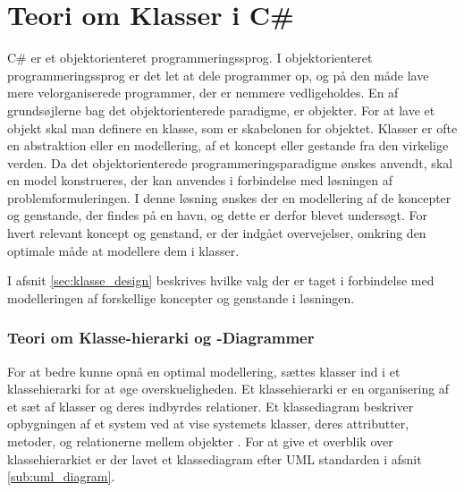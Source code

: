 \section{Teori om Klasser i C\#}
\label{sec:klasse_teori}

C\# er et objektorienteret programmeringssprog. I objektorienteret programmeringssprog er det let at dele programmer op, og på den måde lave mere velorganiserede programmer, der er nemmere vedligeholdes. En af grundsøjlerne bag det objektorienterede paradigme, er objekter. For at lave et objekt skal man definere en klasse, som er skabelonen for objektet. Klasser er ofte en abstraktion eller en modellering, af et koncept eller gestande fra den virkelige verden. Da det objektorienterede programmeringsparadigme ønskes anvendt, skal en model konstrueres, der kan anvendes i forbindelse med løsningen af problemformuleringen. I denne løsning ønskes der en modellering af de koncepter og genstande, der findes på en havn, og dette er derfor blevet undersøgt. For hvert relevant koncept og genstand, er der indgået overvejelser, omkring den optimale måde at modellere dem i klasser.

I afsnit \cref{sec:klasse_design} beskrives hvilke valg der er taget i forbindelse med modelleringen af forskellige koncepter og genstande i løsningen.

\subsubsection{Teori om Klasse-hierarki og -Diagrammer}
\label{sub:uml_teori}

For at bedre kunne opnå en optimal modellering, sættes klasser ind i et klassehierarki for at øge overskueligheden. Et klassehierarki er en organisering af et sæt af klasser og deres indbyrdes relationer. Et klassediagram beskriver opbygningen af et system ved at vise systemets klasser, deres attributter, metoder, og relationerne mellem objekter \cite{martin2006agile}. For at give et overblik over klassehierarkiet er der lavet et klassediagram efter UML standarden i afsnit \cref{sub:uml_diagram}.